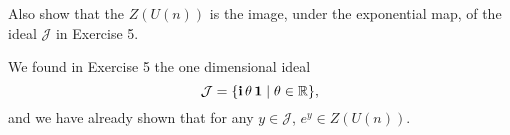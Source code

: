 \documentclass[12pt,onecolumn]{article}
\begin{document}
\begin{exercise}
 Also show that the $Z(U(n))$ is the image, under the exponential map, of the ideal $\mathcal{J}$ in Exercise 5.
 
\end{exercise}
\begin{answer}
We found in Exercise 5 the one dimensional ideal 
$$ \mathcal{J} = \{ \operatorname{\textbf{i}} \theta \operatorname{\mathbf{1}} \mid \theta \in \operatorname{\mathbb{R}} \},$$
and we have already shown that for any $y \in \mathcal{J}$, $e^y \in Z(U(n))$.
\end{answer}
\end{document}
